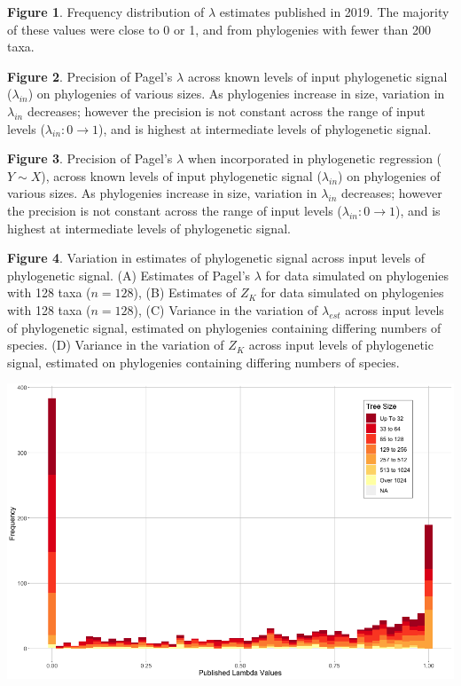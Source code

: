 \documentclass[
]{article}
\begin{document}
\textbf{Figure 1}. Frequency distribution of \(\lambda\) estimates
published in 2019. The majority of these values were close to 0 or 1,
and from phylogenies with fewer than 200 taxa. \hfill\break

\textbf{Figure 2}. Precision of Pagel's \(\lambda\) across known levels
of input phylogenetic signal (\(\lambda_{in}\)) on phylogenies of
various sizes. As phylogenies increase in size, variation in
\(\lambda_{in}\) decreases; however the precision is not constant across
the range of input levels (\(\lambda_{in}: 0 \to 1\)), and is highest at
intermediate levels of phylogenetic signal. \hfill\break

\textbf{Figure 3}. Precision of Pagel's \(\lambda\) when incorporated in
phylogenetic regression (\(Y\sim X\)), across known levels of input
phylogenetic signal (\(\lambda_{in}\)) on phylogenies of various sizes.
As phylogenies increase in size, variation in \(\lambda_{in}\)
decreases; however the precision is not constant across the range of
input levels (\(\lambda_{in}: 0 \to 1\)), and is highest at intermediate
levels of phylogenetic signal. \hfill\break

\textbf{Figure 4}. Variation in estimates of phylogenetic signal across
input levels of phylogenetic signal. (A) Estimates of Pagel's
\(\lambda\) for data simulated on phylogenies with 128 taxa (\(n=128\)),
(B) Estimates of \(Z_K\) for data simulated on phylogenies with 128 taxa
(\(n=128\)), (C) Variance in the variation of \(\lambda_{est}\) across
input levels of phylogenetic signal, estimated on phylogenies containing
differing numbers of species. (D) Variance in the variation of \(Z_K\)
across input levels of phylogenetic signal, estimated on phylogenies
containing differing numbers of species.

\newpage

\includegraphics[width=0.95\linewidth]{Fig1}
\end{document}
